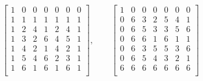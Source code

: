 $$
\left[
\begin{array}{*{7}{c}}
1 & 0 & 0 & 0 & 0 & 0 & 0\\
1 & 1 & 1 & 1 & 1 & 1 & 1\\
1 & 2 & 4 & 1 & 2 & 4 & 1\\
1 & 3 & 2 & 6 & 4 & 5 & 1\\
1 & 4 & 2 & 1 & 4 & 2 & 1\\
1 & 5 & 4 & 6 & 2 & 3 & 1\\
1 & 6 & 1 & 6 & 1 & 6 & 1\\
\end{array}
\right]
, \qquad
\left[
\begin{array}{*{7}{c}}
1 & 0 & 0 & 0 & 0 & 0 & 0\\
0 & 6 & 3 & 2 & 5 & 4 & 1\\
0 & 6 & 5 & 3 & 3 & 5 & 6\\
0 & 6 & 6 & 1 & 6 & 1 & 1\\
0 & 6 & 3 & 5 & 5 & 3 & 6\\
0 & 6 & 5 & 4 & 3 & 2 & 1\\
6 & 6 & 6 & 6 & 6 & 6 & 6\\
\end{array}
\right]
$$
